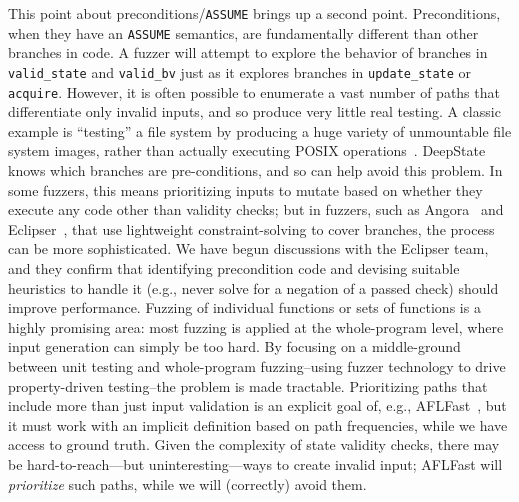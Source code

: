   This point about preconditions/{\tt ASSUME} brings up a second point.  Preconditions, when they have an {\tt ASSUME} semantics, are fundamentally different than other branches in code.  A fuzzer will attempt to explore the behavior of branches in {\tt valid\_state} and {\tt valid\_bv} just as it explores branches in {\tt update\_state} or {\tt acquire}.  However, it is often possible to enumerate a vast number of paths that differentiate only invalid inputs, and so produce very little real testing.  A classic example is ``testing'' a file system by producing a huge variety of unmountable file system images, rather than actually executing POSIX operations~\cite{CFV08,AMAI}.  DeepState knows which branches are pre-conditions, and so can help avoid this problem.  In some fuzzers, this means prioritizing inputs to mutate based on whether they execute any code other than validity checks; but in fuzzers, such as Angora~\cite{angora} and Eclipser~\cite{eclipser}, that use lightweight constraint-solving to cover branches, the process can be more sophisticated.  We have begun discussions with the Eclipser team, and they confirm that identifying precondition code and devising suitable heuristics to handle it (e.g., never solve for a negation of a passed check) should improve performance.  Fuzzing of individual functions or sets of functions is a highly promising area: most fuzzing is applied at the whole-program level, where input generation can simply be too hard.  By focusing on a middle-ground between unit testing and whole-program fuzzing--using fuzzer technology to drive property-driven testing--the problem is made tractable.  Prioritizing paths that include more than just input validation is an explicit goal of, e.g., AFLFast~\cite{aflfast}, but it must work with an implicit definition based on path frequencies, while we have access to ground truth.  Given the complexity of state validity checks, there may be hard-to-reach---but uninteresting---ways to create invalid input; AFLFast will \emph{prioritize} such paths, while we will (correctly) avoid them.

